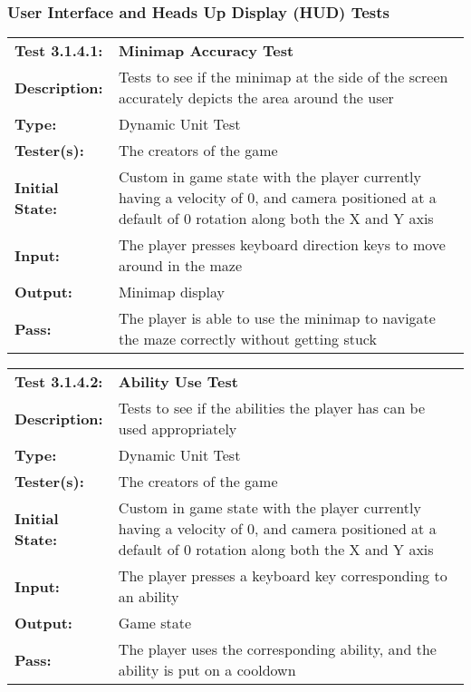 \documentclass[12pt, titlepage]{article}
\begin{document}
\subsubsection{User Interface and Heads Up Display (HUD) Tests}
\begin{mdframed}[linewidth=1pt]
\begin{tabularx}{\textwidth}{@{}p{3cm}X@{}}
{\bf Test 3.1.4.1:} & {\bf Minimap Accuracy Test}\\[\baselineskip]
{\bf Description:} & Tests to see if the minimap at the side of the screen accurately depicts the area around the user\\[0.5\baselineskip]
{\bf Type:} & Dynamic Unit Test\\[0.5\baselineskip]
{\bf Tester(s):} & The creators of the game\\[0.5\baselineskip]
{\bf Initial State:} & Custom in game state with the player currently having a velocity of 0, and camera positioned at a default of 0 rotation along both the X and Y axis\\[0.5\baselineskip]
{\bf Input:} & The player presses keyboard direction keys to move around in the maze\\[0.5\baselineskip]
{\bf Output:} & Minimap display\\[0.5\baselineskip]
{\bf Pass:} & The player is able to use the minimap to navigate the maze correctly without getting stuck
\end{tabularx}
\end{mdframed}

\begin{mdframed}[linewidth=1pt]
\begin{tabularx}{\textwidth}{@{}p{3cm}X@{}}
{\bf Test 3.1.4.2:} & {\bf Ability Use Test}\\[\baselineskip]
{\bf Description:} & Tests to see if the abilities the player has can be used appropriately \\[0.5\baselineskip]
{\bf Type:} & Dynamic Unit Test\\[0.5\baselineskip]
{\bf Tester(s):} & The creators of the game\\[0.5\baselineskip]
{\bf Initial State:} & Custom in game state with the player currently having a velocity of 0, and camera positioned at a default of 0 rotation along both the X and Y axis\\[0.5\baselineskip]
{\bf Input:} & The player presses a keyboard key corresponding to an ability \\[0.5\baselineskip]
{\bf Output:} & Game state\\[0.5\baselineskip]
{\bf Pass:} & The player uses the corresponding ability, and the ability is put on a cooldown
\end{tabularx}
\end{mdframed}
\end{document}
